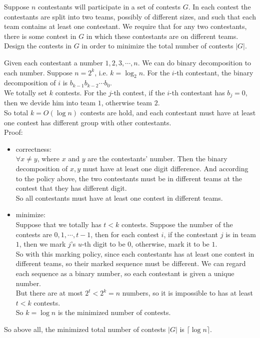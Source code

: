\problem{}
Suppose $n$ contestants will participate in a set of contests $G$.  In each contest the contestants are split into two teams, possibly of different sizes, and such that each team contains at least one contestant.  We require that for any two contestants, there is some contest in $G$ in which these contestants are on different teams.  Design the contests in $G$ in order to minimize the total number of contests $|G|$.

\solution{}

Given each contestant a number $1,2,3,\cdots,n$. We can do binary decomposition to each number.
Suppose $n=2^k$, i.e. $k=\log_{2}{n}$. For the $i$-th contestant, the binary decomposition of $i$ is $b_{k-1}b_{k-2}\cdots b_0$.\\
We totally set $k$ contests.
For the $j$-th contest, if the $i$-th contestant has $b_j=0$, then we devide him into team $1$, otherwise team $2$.\\
So total $k=O(\log n)$ contests are hold, and each contestant must have at least one contest has different group with other contestants.\\

Proof:
\begin{itemize}
    \item correctness:\\
    $\forall x\neq y$, where $x$ and $y$ are the contestants' number. Then the binary decomposition of $x,y$ must have at least one digit difference.
    And according to the policy above, the two contestants must be in different teams at the contest that they has different digit.\\
    So all contestants must have at least one contest in different teams.
    \item minimize:\\
    Suppose that we totally has $t<k$ contests. Suppose the number of the contests are $0,1,\cdots, t-1$, then for each contest $i$, if the contestant $j$
    is in team $1$, then we mark $j$'s $u$-th digit to be $0$, otherwise, mark it to be $1$.\\
    So with this marking policy, since each contestants has at least one contest in different teams, so their marked sequence must be different. We can regard each 
    sequence as a binary number, so each contestant is given a unique number.\\
    But there are at most $2^t<2^k=n$ numbers, so it is impossible to has at least $t<k$ contests.\\
    So $k=\log n$ is the minimized number of contests.
\end{itemize}

So above all, the minimized total number of contests $|G|$ is $\lceil\log n\rceil$.\\

\newpage